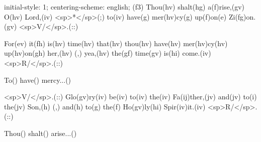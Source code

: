 initial-style: 1;
centering-scheme: english;
(f3) Thou(hv) shalt(hg) a(f)rise,(gv) O(hv) Lord,(iv) <sp>*</sp>(;) to(iv) have(g) mer(hv)cy(g) up(f)on(e) Zi(fg)on.(gv) <sp>V/</sp>.(::)

For(ev) it(fh) is(hv) time(hv) that(hv) thou(hv) have(hv) mer(hv)cy(hv) up(hv)on(gh) her,(hv) (,) yea,(hv) the(gf) time(gv) is(hi) come.(iv) <sp>R/</sp>.(::)

To() have() mercy...()

<sp>V/</sp>.(::) Glo(gv)ry(iv) be(iv) to(iv) the(iv) Fa(ij)ther,(jv) and(jv) to(i) the(jv) Son,(h) (,) and(h) to(g) the(f) Ho(gv)ly(hi) Spir(iv)it.(iv) <sp>R/</sp>.(::)

Thou() shalt() arise...()
